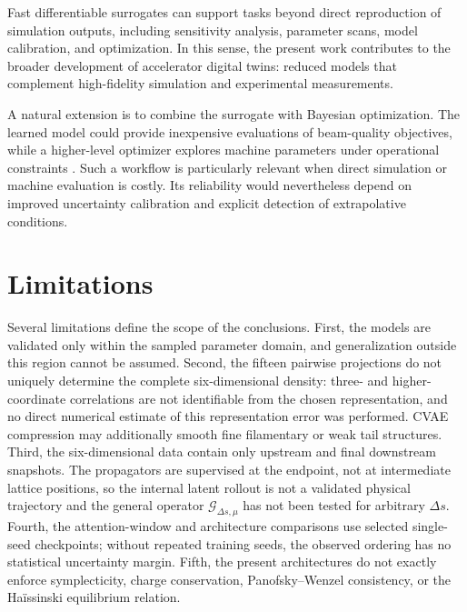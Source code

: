 Fast differentiable surrogates can support tasks beyond direct reproduction of simulation outputs, including sensitivity analysis, parameter scans, model calibration, and optimization. In this sense, the present work contributes to the broader development of accelerator digital twins: reduced models that complement high-fidelity simulation and experimental measurements.

A natural extension is to combine the surrogate with Bayesian optimization. The learned model could provide inexpensive evaluations of beam-quality objectives, while a higher-level optimizer explores machine parameters under operational constraints \cite{roussel2024bayesian}. Such a workflow is particularly relevant when direct simulation or machine evaluation is costly. Its reliability would nevertheless depend on improved uncertainty calibration and explicit detection of extrapolative conditions.

\section{Limitations}
\label{sec:06_discussion_and_perspectives_limitations}

Several limitations define the scope of the conclusions. First, the models are validated only within the sampled parameter domain, and generalization outside this region cannot be assumed. Second, the fifteen pairwise projections do not uniquely determine the complete six-dimensional density: three- and higher-coordinate correlations are not identifiable from the chosen representation, and no direct numerical estimate of this representation error was performed. CVAE compression may additionally smooth fine filamentary or weak tail structures. Third, the six-dimensional data contain only upstream and final downstream snapshots. The propagators are supervised at the endpoint, not at intermediate lattice positions, so the internal latent rollout is not a validated physical trajectory and the general operator \(\mathcal{G}_{\Delta s , \mu}\) has not been tested for arbitrary \(\Delta s .\) Fourth, the attention-window and architecture comparisons use selected single-seed checkpoints; without repeated training seeds, the observed ordering has no statistical uncertainty margin. Fifth, the present architectures do not exactly enforce symplecticity, charge conservation, Panofsky–Wenzel consistency, or the Haïssinski equilibrium relation.

